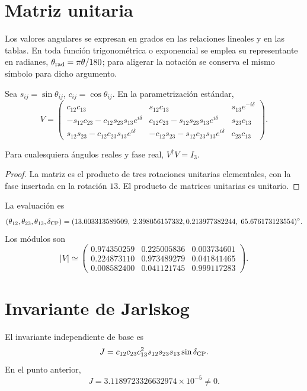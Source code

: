 \section{Matriz unitaria}

Los valores angulares se expresan en grados en las relaciones lineales y en
las tablas. En toda función trigonométrica o exponencial se emplea su
representante en radianes, \(\theta_{\rm rad}=\pi\theta/180\); para aligerar
la notación se conserva el mismo símbolo para dicho argumento.

Sea \(s_{ij}=\sin\theta_{ij}\), \(c_{ij}=\cos\theta_{ij}\). En la
parametrización estándar,
\[
V=
\begin{pmatrix}
c_{12}c_{13}&s_{12}c_{13}&s_{13}e^{-i\delta}\\
-s_{12}c_{23}-c_{12}s_{23}s_{13}e^{i\delta}&
c_{12}c_{23}-s_{12}s_{23}s_{13}e^{i\delta}&s_{23}c_{13}\\
s_{12}s_{23}-c_{12}c_{23}s_{13}e^{i\delta}&
-c_{12}s_{23}-s_{12}c_{23}s_{13}e^{i\delta}&c_{23}c_{13}
\end{pmatrix}.
\]

\begin{proposition}[Unitariedad]
Para cualesquiera ángulos reales y fase real, \(V^\dagger V=I_3\).
\end{proposition}
\begin{proof}
La matriz es el producto de tres rotaciones unitarias elementales, con la fase
insertada en la rotación \(13\). El producto de matrices unitarias es
unitario.
\end{proof}

La evaluación es
\[
 (\theta_{12},\theta_{23},\theta_{13},\delta_{\rm CP})
 =(13.003313589509,\;2.398056157332,
 0.213977382244,\;65.676173123554)^\circ.
\]
Los módulos son
\[
 |V|\simeq
 \begin{pmatrix}
 0.974350259&0.225005836&0.003734601\\
 0.224873110&0.973489279&0.041841465\\
 0.008582400&0.041121745&0.999117283
 \end{pmatrix}.
\]

\section{Invariante de Jarlskog}

El invariante independiente de base es
\[
 J=c_{12}c_{23}c_{13}^2s_{12}s_{23}s_{13}\sin\delta_{\rm CP}.
\]
En el punto anterior,
\[
 \boxed{J=3.1189723326632974\times10^{-5}\ne0.}
\]

